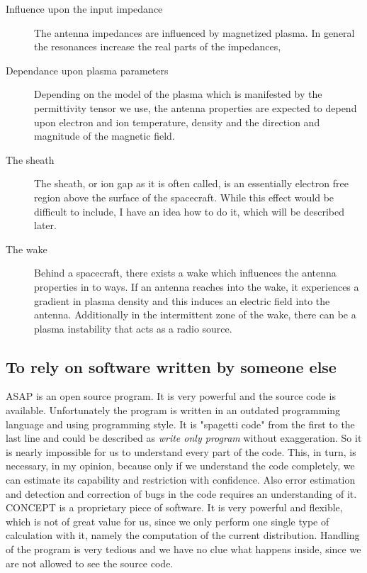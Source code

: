 \documentclass[a4paper,10pt]{article}
\begin{document}
\begin{description}
\item[Influence upon the input impedance]
The antenna impedances are influenced by magnetized plasma. In general the resonances increase the real parts of the impedances,

\item[Dependance upon plasma parameters]
Depending on the model of the plasma which is manifested by the permittivity tensor we use, the antenna properties are expected to depend upon electron and ion temperature, density and the direction and magnitude of the magnetic field.

\item[The sheath]
The sheath, or ion gap as it is often called, is an essentially electron free region above the surface of the spacecraft. While this effect would be difficult to include, I have an idea how to do it, which will be described later.

\item[The wake]
Behind a spacecraft, there exists a wake which influences the antenna properties in to ways. If an antenna reaches into the wake, it experiences a gradient in plasma density and this induces an electric field into the antenna. Additionally in the intermittent zone of the wake, there can be a plasma instability that acts as a radio source.
\end{description}

\subsection{To rely on software written by someone else}
ASAP is an open source program. It is very powerful and the source code is available. Unfortunately the program is written in an outdated programming language and using programming style. It is "spagetti code" from the first to the last line and could be described as \emph{write only program} without exaggeration. So it is nearly impossible for us to understand every part of the code. This, in turn, is necessary, in my opinion, because only if we understand the code completely, we can estimate its capability and restriction with confidence. Also error estimation and detection and correction of bugs in the code requires an understanding of it.\\

CONCEPT is a proprietary piece of software. It is very powerful and flexible, which is not of great value for us, since we only perform one single type of calculation with it, namely the computation of the current distribution. Handling of the program is very tedious and we have no clue what happens inside, since we are not allowed to see the source code.\\
\end{document}
